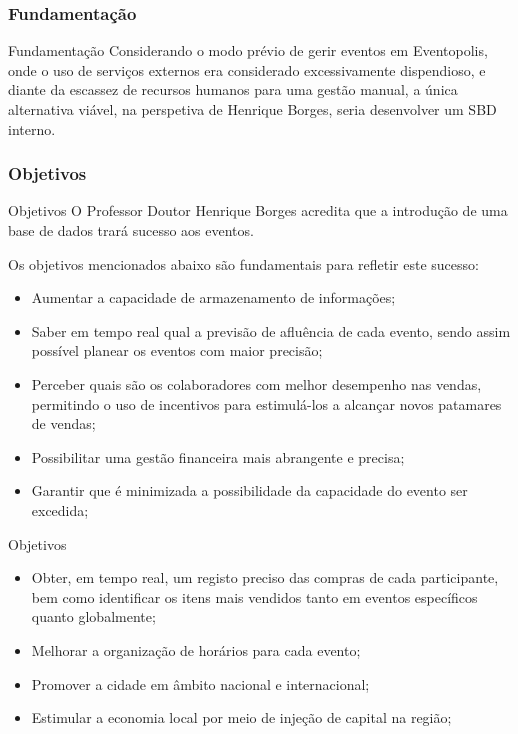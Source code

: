 \documentclass[compress,svgnames,handout,13.7pt]{beamer}
\begin{document}
\subsubsection{Fundamentação}
\begin{frame}{Fundamentação}
Considerando o modo prévio de gerir eventos em Eventopolis, onde o uso de serviços externos era considerado excessivamente dispendioso, e diante da escassez de recursos humanos para uma gestão manual, a única alternativa viável, na perspetiva de Henrique Borges, seria desenvolver um SBD interno.
\end{frame}

\subsubsection{Objetivos}
\begin{frame}{Objetivos}
    O Professor Doutor Henrique Borges acredita que a introdu\c{c}\~{a}o de uma base de dados
    trar\'{a} sucesso aos eventos.

    Os objetivos mencionados abaixo s\~{a}o fundamentais para refletir este sucesso:
    \begin{itemize}
    \item Aumentar a capacidade de armazenamento de informa\c{c}\~{o}es;
    \item Saber em tempo real qual a previsão de afluência de cada evento, sendo assim possível
planear os eventos com maior precisão;
    \item Perceber quais são os colaboradores com melhor desempenho nas vendas, permitindo o
uso de incentivos para estimulá-los a alcançar novos patamares de vendas;
    \item Possibilitar uma gestão financeira mais abrangente e precisa;
    \item Garantir que é minimizada a possibilidade da capacidade do evento ser excedida;
    \end{itemize}
\end{frame}
\begin{frame}{Objetivos}
    \begin{itemize}
        \item Obter, em tempo real, um registo preciso das compras de cada participante, bem como
identificar os itens mais vendidos tanto em eventos específicos quanto globalmente;
        \item Melhorar a organiza\c{c}\~{a}o de hor\'{a}rios para cada evento;
        \item Promover a cidade em \^{a}mbito nacional e internacional;
        \item Estimular a economia local por meio de inje\c{c}\~{a}o de capital na regi\~{a}o;
    \end{itemize}
\end{frame}
\end{document}
